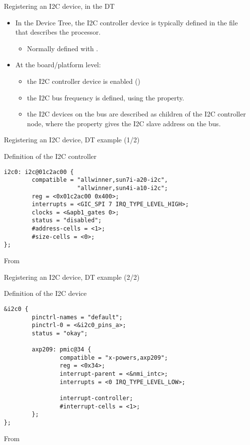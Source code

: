 \begin{frame}{Registering an I2C device, in the DT}
  \begin{itemize}
  \item In the Device Tree, the I2C controller device is typically
    defined in the  file that describes the processor.
    \begin{itemize}
    \item Normally defined with .
    \end{itemize}
  \item At the board/platform level:
    \begin{itemize}
    \item the I2C controller device is enabled
      ()
    \item the I2C bus frequency is defined, using the
       property.
    \item the I2C devices on the bus are described as children of the
      I2C controller node, where the  property gives the I2C
      slave address on the bus.
    \end{itemize}
  \end{itemize}
\end{frame}

\begin{frame}[fragile]{Registering an I2C device, DT example (1/2)}
  \begin{block}{Definition of the I2C controller}
    \begin{verbatim}
i2c0: i2c@01c2ac00 {
        compatible = "allwinner,sun7i-a20-i2c",
                     "allwinner,sun4i-a10-i2c";
        reg = <0x01c2ac00 0x400>;
        interrupts = <GIC_SPI 7 IRQ_TYPE_LEVEL_HIGH>;
        clocks = <&apb1_gates 0>;
        status = "disabled";
        #address-cells = <1>;
        #size-cells = <0>;
};
    \end{verbatim}
  \end{block}
  From 
\end{frame}

\begin{frame}[fragile]{Registering an I2C device, DT example (2/2)}
  \begin{block}{Definition of the I2C device}
    \begin{verbatim}
&i2c0 {
        pinctrl-names = "default";
        pinctrl-0 = <&i2c0_pins_a>;
        status = "okay";

        axp209: pmic@34 {
                compatible = "x-powers,axp209";
                reg = <0x34>;
                interrupt-parent = <&nmi_intc>;
                interrupts = <0 IRQ_TYPE_LEVEL_LOW>;

                interrupt-controller;
                #interrupt-cells = <1>;
        };
};
    \end{verbatim}
  \end{block}
  From 
\end{frame}

